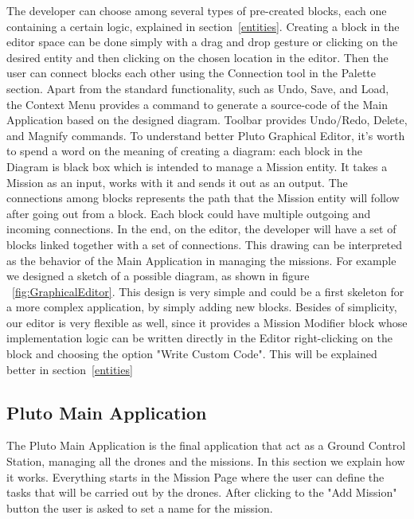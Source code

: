 The developer can choose among several types of pre-created blocks, each one containing a certain logic, explained in section~\ref{entities}. Creating a block in the editor space can be done simply with a drag and drop gesture or clicking on the desired entity and then clicking on the chosen location in the editor. Then the user can connect blocks each other using the Connection tool in the Palette section.
Apart from the standard functionality, such as Undo, Save, and Load, the Context Menu provides a command to generate a source-code of the Main Application based on the designed diagram. Toolbar provides Undo/Redo, Delete, and Magnify commands.
To understand better Pluto Graphical Editor, it's worth to spend a word on the meaning of creating a diagram: each block in the Diagram is black box which is intended to manage a Mission entity. It takes a Mission as an input, works with it and sends it out as an output. The connections among blocks represents the path that the Mission entity will follow after going out from a block. Each block could have multiple outgoing and incoming connections.
In the end, on the editor, the developer will have a set of blocks linked together with a set of connections. This drawing can be interpreted as the behavior of the Main Application in managing the missions. For example we designed a sketch of a possible diagram, as shown in figure ~\ref{fig:GraphicalEditor}. This design is very simple and could be a first skeleton for a more complex application, by simply adding new blocks.
Besides of simplicity, our editor is very flexible as well, since it provides a Mission Modifier block whose implementation logic can be written directly in the Editor right-clicking on the block and choosing the option "Write Custom Code". This will be explained better in section~\ref{entities}

\subsection{Pluto Main Application}
\label{plutoMainApp}

The Pluto Main Application is the final application that act as a Ground Control Station, managing all the drones and the missions. In this section we explain how it works.
Everything starts in the Mission Page where the user can define the tasks that will be carried out by the drones. After clicking to the "Add Mission" button the user is asked to set a name for the mission.

